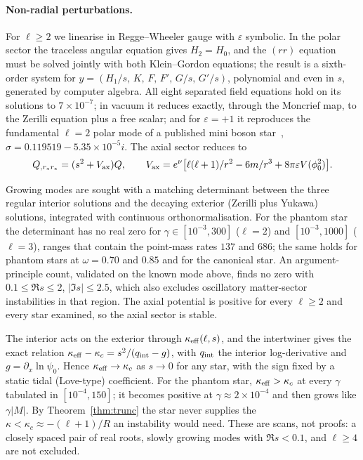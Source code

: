 \documentclass[11pt]{article}
\theoremstyle{remark}
\begin{document}
\paragraph{Non-radial perturbations.} For $\ell\ge2$ we linearise in Regge--Wheeler gauge with $\varepsilon$ symbolic.
In the polar sector the traceless angular equation gives $H_2=H_0$, and the $(rr)$ equation must be solved jointly with
both Klein--Gordon equations; the result is a sixth-order system for
$y=(H_1/s,\,K,\,F,\,F',\,G/s,\,G'/s)$, polynomial and even in
$s$, generated by computer algebra. All eight separated field equations hold on its solutions to $7\times10^{-7}$; in
vacuum it reduces exactly, through the Moncrief map, to the Zerilli equation plus a free scalar; and for $\varepsilon=+1$
it reproduces the fundamental $\ell=2$ polar mode of a published mini boson star~\cite{Macedo2013},
$\sigma=0.119519-5.35\times10^{-5}i$. The axial sector reduces to
\begin{equation}
Q_{,r_*r_*}=(s^2+V_{\rm ax})Q,\qquad V_{\rm ax}=e^{\nu}\big[\ell(\ell+1)/r^2-6m/r^3+8\pi\varepsilon V(\phi_0^2)\big].
\end{equation}

Growing modes are sought with a matching determinant between the three regular interior solutions and the decaying
exterior (Zerilli plus Yukawa) solutions, integrated with continuous orthonormalisation. For the phantom star the
determinant has no real zero for $\gamma\in[10^{-3},300]$ ($\ell=2$) and $[10^{-3},1000]$ ($\ell=3$), ranges that contain
the point-mass rates $137$ and $686$; the same holds for phantom stars at $\omega=0.70$ and $0.85$ and for the canonical
star. An argument-principle count, validated on the known mode above, finds no zero with $0.1\le\Re s\le2$,
$|\Im s|\le2.5$, which also excludes oscillatory matter-sector instabilities in that region. The axial potential is
positive for every $\ell\ge2$ and every star examined, so the axial sector is stable.

The interior acts on the exterior through $\kappa_{\rm eff}(\ell,s)$, and the intertwiner gives the exact relation
$\kappa_{\rm eff}-\kappa_c=s^2/(q_{\rm int}-g)$, with $q_{\rm int}$ the interior log-derivative and $g=\partial_x\ln\psi_0$.
Hence $\kappa_{\rm eff}\to\kappa_c$ as $s\to0$ for any star, with the sign fixed by a static tidal (Love-type)
coefficient. For the phantom star, $\kappa_{\rm eff}>\kappa_c$ at every $\gamma$ tabulated in $[10^{-4},150]$; it becomes
positive at $\gamma\approx2\times10^{-4}$ and then grows like $\gamma|M|$. By Theorem~\ref{thm:trunc} the star never
supplies the $\kappa<\kappa_c\approx-(\ell+1)/R$ an instability would need. These are scans, not proofs: a closely spaced
pair of real roots, slowly growing modes with $\Re s<0.1$, and $\ell\ge4$ are not excluded.
\end{document}
